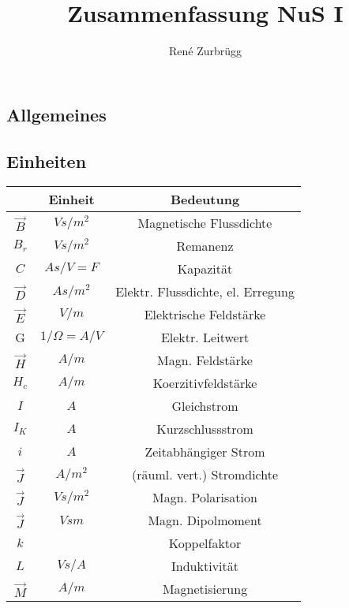 \documentclass[a4paper, 11pt]{scrartcl}
\title{Zusammenfassung NuS I}
\author{René Zurbrügg}
\date{}
\begin{document}
		\maketitle
		
		\begin{multicols*}{2}

\section{Allgemeines}
				\subsection{Einheiten}
				\vspace{-0.1cm}
				\begin{center}
				\begin{tabular}{|c|c|c|}
				\hline
				\textbf{} & \textbf{Einheit} & \textbf{Bedeutung} \\
				\hline
				$\vec{B}$ & $Vs/m^2$ & Magnetische Flussdichte \\
				\hline
				$B_r$ & $Vs/m^2$ & Remanenz \\
				\hline
				$C$ & $As/V=F$ & Kapazität \\
				\hline
				$\vec{D}$ & $As/m^2$ & Elektr. Flussdichte, el. Erregung \\
				\hline
				$\vec{E}$ & $V/m$ & Elektrische Feldstärke \\
				\hline
				G & $1/\Omega=A/V$ & Elektr. Leitwert \\
				\hline
				$\vec{H}$ & $A/m$ & Magn. Feldstärke \\
				\hline 
				$H_c$ & $A/m$ & Koerzitivfeldstärke \\
				\hline
				$I$ & $A$ & Gleichstrom \\
				\hline
			    $I_K$ & $A$ & Kurzschlussstrom \\
				\hline
				$i$ & $A$ & Zeitabhängiger Strom \\
				\hline
				$\vec{J}$ & $A/m^2$ & (räuml. vert.) Stromdichte \\
				\hline
				$\vec{J}$ & $Vs/m^2$ & Magn. Polarisation \\
				\hline
				$\vec{J}$ & $Vsm$ & Magn. Dipolmoment \\
				\hline
				$k$ & & Koppelfaktor \\
				\hline
				$L$ & $Vs/A$ & Induktivität \\
				\hline
				$\vec{M}$ & $A/m$ & Magnetisierung \\

\end{tabular}
\end{center}
\end{multicols*}
\end{document}
